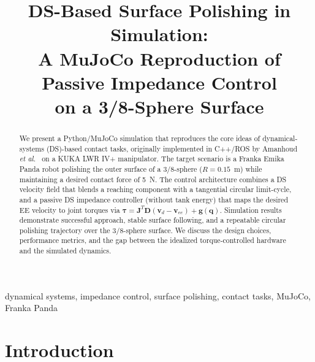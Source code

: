 \documentclass[conference]{IEEEtran}
\newcommand{\vd}{\mathbf{v}_d}
\newcommand{\veeEE}{\mathbf{v}_{ee}}
\newcommand{\qq}{\mathbf{q}}
\newcommand{\JJ}{\mathbf{J}}
\newcommand{\DD}{\mathbf{D}}
\newcommand{\tauv}{\boldsymbol{\tau}}
\begin{document}
\title{DS-Based Surface Polishing in Simulation:\\
A MuJoCo Reproduction of Passive Impedance Control\\
on a 3/8-Sphere Surface}

\author{
}

\maketitle

\begin{abstract}
We present a Python/MuJoCo simulation that reproduces the core ideas of
dynamical-systems (DS)-based contact tasks, originally implemented in C++/ROS
by Amanhoud \emph{et al.}~\cite{amanhoud2019} on a KUKA LWR IV+ manipulator.
The target scenario is a Franka Emika Panda robot polishing the outer surface of
a $3/8$-sphere ($R=0.15$~m) while maintaining a desired contact force of 5~N.
The control architecture combines a DS velocity field that blends a reaching
component with a tangential circular limit-cycle, and a passive DS impedance
controller (without tank energy) that maps the desired EE velocity to joint
torques via $\tauv = \JJ^T \DD(\vd - \veeEE) + \mathbf{g}(\qq)$.
Simulation results demonstrate successful approach, stable surface following,
and a repeatable circular polishing trajectory over the $3/8$-sphere surface.
We discuss the design choices, performance metrics, and the gap between
the idealized torque-controlled hardware and the simulated dynamics.
\end{abstract}

\begin{IEEEkeywords}
dynamical systems, impedance control, surface polishing, contact tasks,
MuJoCo, Franka Panda
\end{IEEEkeywords}

\section{Introduction}
\label{sec:intro}
\end{document}
